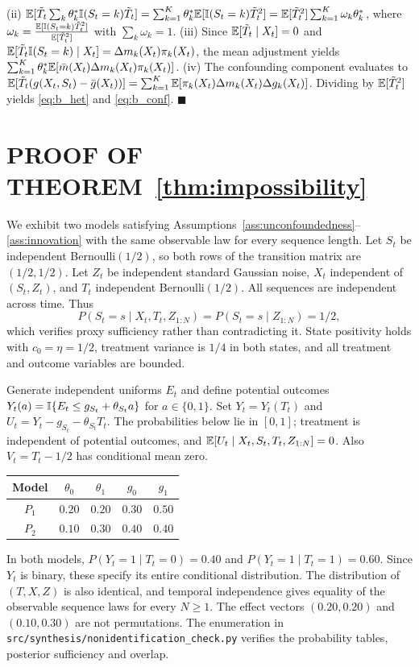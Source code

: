 (ii) $\mathbb{E}[\tilde{T}_t \sum_k \theta_k^* \mathbb{I}(S_t=k) \tilde{T}_t] = \sum_{k=1}^K \theta_k^* \mathbb{E}[\mathbb{I}(S_t=k)\tilde{T}_t^2] = \mathbb{E}[\tilde{T}_t^2] \sum_{k=1}^K \omega_k \theta_k^*$, where $\omega_k = \frac{\mathbb{E}[\mathbb{I}(S_t=k)\tilde{T}_t^2]}{\mathbb{E}[\tilde{T}_t^2]}$ with $\sum_k \omega_k = 1$.
(iii) Since $\mathbb{E}[\tilde{T}_t \mid X_t] = 0$ and $\mathbb{E}[\tilde{T}_t \mathbb{I}(S_t=k) \mid X_t] = \Delta m_k(X_t) \pi_k(X_t)$, the mean adjustment yields $\sum_{k=1}^K \theta_k^* \mathbb{E}[\bar{m}(X_t) \Delta m_k(X_t) \pi_k(X_t)]$.
(iv) The confounding component evaluates to $\mathbb{E}[\tilde{T}_t (g(X_t, S_t) - \bar{g}(X_t))] = \sum_{k=1}^K \mathbb{E}[\pi_k(X_t) \Delta m_k(X_t) \Delta g_k(X_t)]$.
Dividing by $\mathbb{E}[\tilde{T}_t^2]$ yields \eqref{eq:b_het} and \eqref{eq:b_conf}. $\blacksquare$

\section{PROOF OF THEOREM~\ref{thm:impossibility}}
\label{app:proof_thm2}
We exhibit two models satisfying Assumptions~\ref{ass:unconfoundedness}--\ref{ass:innovation} with the same observable law for every sequence length. Let $S_t$ be independent Bernoulli$(1/2)$, so both rows of the transition matrix are $(1/2,1/2)$. Let $Z_t$ be independent standard Gaussian noise, $X_t$ independent of $(S_t,Z_t)$, and $T_t$ independent Bernoulli$(1/2)$. All sequences are independent across time. Thus
\[
P(S_t=s\mid X_t,T_t,Z_{1:N})=P(S_t=s\mid Z_{1:N})=1/2,
\]
which verifies proxy sufficiency rather than contradicting it. State positivity holds with $c_0=\eta=1/2$, treatment variance is $1/4$ in both states, and all treatment and outcome variables are bounded.

Generate independent uniforms $E_t$ and define potential outcomes $Y_t(a)=\mathbb{I}\{E_t\le g_{S_t}+\theta_{S_t}a\}$ for $a\in\{0,1\}$. Set $Y_t=Y_t(T_t)$ and $U_t=Y_t-g_{S_t}-\theta_{S_t}T_t$. The probabilities below lie in $[0,1]$; treatment is independent of potential outcomes, and $\mathbb{E}[U_t\mid X_t,S_t,T_t,Z_{1:N}]=0$. Also $V_t=T_t-1/2$ has conditional mean zero.
\begin{center}\begin{tabular}{c|cc|cc}
Model & $\theta_0$ & $\theta_1$ & $g_0$ & $g_1$\\\hline
$P_1$ & $0.20$ & $0.20$ & $0.30$ & $0.50$\\
$P_2$ & $0.10$ & $0.30$ & $0.40$ & $0.40$
\end{tabular}\end{center}
In both models, $P(Y_t=1\mid T_t=0)=0.40$ and $P(Y_t=1\mid T_t=1)=0.60$. Since $Y_t$ is binary, these specify its entire conditional distribution. The distribution of $(T,X,Z)$ is also identical, and temporal independence gives equality of the observable sequence laws for every $N\ge1$. The effect vectors $(0.20,0.20)$ and $(0.10,0.30)$ are not permutations. The enumeration in \texttt{src/synthesis/nonidentification\_check.py} verifies the probability tables, posterior sufficiency and overlap.


